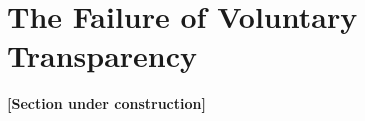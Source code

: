 \section{The Failure of Voluntary Transparency}
\label{sec:voluntary}

\textbf{[Section under construction]}
